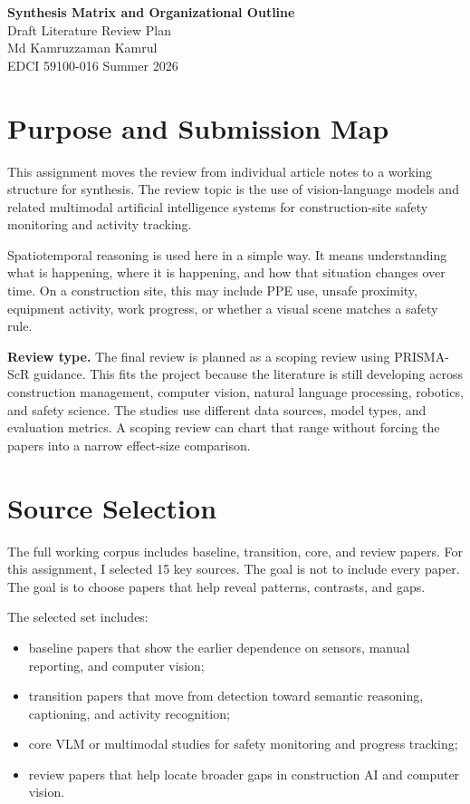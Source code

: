 \documentclass[10pt, letterpaper]{article}
\begin{document}
\begin{center}
{\Large\bfseries Synthesis Matrix and Organizational Outline}\\[0.35em]
{\normalsize Draft Literature Review Plan}\\[0.25em]
{\normalsize Md Kamruzzaman Kamrul}\\
{\normalsize EDCI 59100-016 \textbar{} Summer 2026}
\end{center}

\vspace{0.6em}

\section{Purpose and Submission Map}

This assignment moves the review from individual article notes to a working structure for synthesis. The review topic is the use of vision-language models and related multimodal artificial intelligence systems for construction-site safety monitoring and activity tracking.

Spatiotemporal reasoning is used here in a simple way. It means understanding what is happening, where it is happening, and how that situation changes over time. On a construction site, this may include PPE use, unsafe proximity, equipment activity, work progress, or whether a visual scene matches a safety rule.

\textbf{Review type.} The final review is planned as a scoping review using PRISMA-ScR guidance. This fits the project because the literature is still developing across construction management, computer vision, natural language processing, robotics, and safety science. The studies use different data sources, model types, and evaluation metrics. A scoping review can chart that range without forcing the papers into a narrow effect-size comparison.

\section{Source Selection}

The full working corpus includes baseline, transition, core, and review papers. For this assignment, I selected 15 key sources. The goal is not to include every paper. The goal is to choose papers that help reveal patterns, contrasts, and gaps.

The selected set includes:

\begin{itemize}
\item baseline papers that show the earlier dependence on sensors, manual reporting, and computer vision;
\item transition papers that move from detection toward semantic reasoning, captioning, and activity recognition;
\item core VLM or multimodal studies for safety monitoring and progress tracking;
\item review papers that help locate broader gaps in construction AI and computer vision.
\end{itemize}
\end{document}
